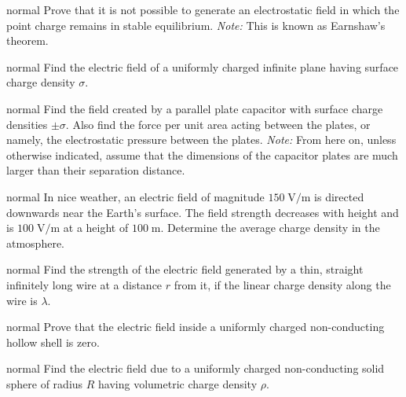 \hypertarget{P66}{}
\begin{solution}{normal} %
Prove that it is not possible to generate an electrostatic field in which the point charge remains in stable equilibrium. \textit{Note:} This is known as Earnshaw's theorem.
\end{solution}

\hypertarget{P67}{}
\begin{solution}{normal} %
Find the electric field of a uniformly charged infinite plane having surface charge density $\sigma$.
\end{solution}

\hypertarget{P68}{}
\begin{solution}{normal} %
Find the field created by a parallel plate capacitor with surface charge densities $\pm \sigma$. Also find the force per unit area acting between the plates, or namely, the electrostatic pressure between the plates. \textit{Note:} From here on, unless otherwise indicated, assume that the dimensions of the capacitor plates are much larger than their separation distance.
\end{solution}

\hypertarget{P69}{}
\begin{solution}{normal} %
In nice weather, an electric field of magnitude $150\;\text{V}/\text{m}$ is directed downwards near the Earth's surface. The field strength decreases with height and is $100\;\text{V}/\text{m}$ at a height of $100\;\text{m}$. Determine the average charge density in the atmosphere.
\end{solution}

\hypertarget{P70}{}
\begin{solution}{normal} %
Find the strength of the electric field generated by a thin, straight infinitely long wire at a distance $r$ from it, if the linear charge density along the wire is $\lambda$.
\end{solution}

\hypertarget{P71}{}
\begin{solution}{normal} %
Prove that the electric field inside a uniformly charged non-conducting hollow shell is zero.
\end{solution}

\hypertarget{P72}{}
\begin{solution}{normal} %
Find the electric field due to a uniformly charged non-conducting solid sphere of radius $R$ having volumetric charge density $\rho$.
\end{solution}

